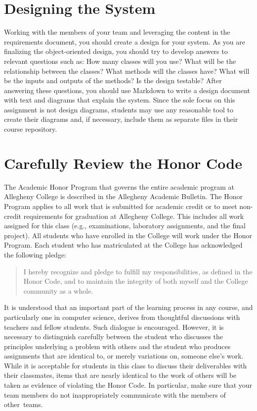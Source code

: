 \section*{Designing the System}

Working with the members of your team and leveraging the content in the requirements document, you should create a
design for your system.  As you are finalizing the object-oriented design, you should try to develop answers to relevant
questions such as: How many classes will you use? What will be the relationship between the classes? What methods will
the classes have? What will be the inputs and outputs of the methods?  Is the design testable?  After answering these
questions, you should use Markdown to write a design document with text and diagrams that explain the system. Since the
sole focus on this assignment is not design diagrams, students may use any reasonable tool to create their diagrams and,
if necessary, include them as separate files in their course repository.

\section*{Carefully Review the Honor Code}

The Academic Honor Program that governs the entire academic program at Allegheny College is described in the Allegheny
Academic Bulletin.  The Honor Program applies to all work that is submitted for academic credit or to meet non-credit
requirements for graduation at Allegheny College.  This includes all work assigned for this class (e.g., examinations,
  laboratory assignments, and the final project).  All students who have enrolled in the College will work under the Honor
Program.  Each student who has matriculated at the College has acknowledged the following pledge:

\vspace*{-.05in}
\begin{quote}
  I hereby recognize and pledge to fulfill my responsibilities, as defined in the Honor Code, and to maintain the
  integrity of both myself and the College community as a whole.
\end{quote}
\vspace*{-.05in}

\noindent It is understood that an important part of the learning process in any course, and particularly one in
computer science, derives from thoughtful discussions with teachers and fellow students.  Such dialogue is encouraged.
However, it is necessary to distinguish carefully between the student who discusses the principles underlying a problem
with others and the student who produces assignments that are identical to, or merely variations on, someone else's
work.  While it is acceptable for students in this class to discuss their deliverables with their classmates, items that
are nearly identical to the work of others will be taken as evidence of violating the Honor Code. In particular, make
sure that your team members do not inappropriately communicate with the members of \mbox{other teams}.

